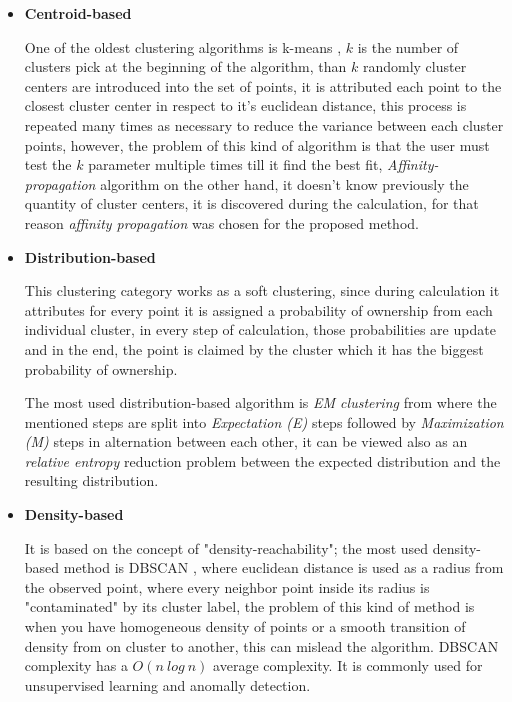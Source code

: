 \documentclass[ecp,tc,english]{iiufrgs}
\begin{document}
        \begin{itemize} 
            \item \textbf{Centroid-based}
            
            One of the oldest clustering algorithms is k-means \cite{steinhaus1956, macqueen1967}, \(k\) is the number of clusters pick at the beginning of the algorithm, than \(k\) randomly cluster centers are introduced into the set of points, it is attributed each point to the closest cluster center in respect to it's euclidean distance, this process is repeated many times as necessary to reduce the variance between each cluster points, however, the problem of this kind of algorithm is that the user must test the \(k\) parameter multiple times till it find the best fit, \textit{Affinity-propagation} algorithm  \cite{frey2007} on the other hand, it doesn't know previously the quantity of cluster centers, it is discovered during the calculation, for that reason \textit{affinity propagation} was chosen for the proposed method. 
            
            \item \textbf{Distribution-based} 
            
            This clustering category works as a soft clustering, since during calculation it attributes for every point it is assigned a probability of ownership from each individual cluster, in every step of calculation, those probabilities are update and in the end, the point is claimed by the cluster which it has the biggest probability of ownership.
            
            The most used distribution-based algorithm is \textit{EM clustering} from \cite{dempster1977} where the mentioned steps are split into \textit{Expectation (E)} steps followed by \textit{Maximization (M)} steps in alternation between each other, it can be viewed also as an \textit{relative entropy} reduction problem \cite{kullback1951} between the expected distribution and the resulting distribution.
            
            \item \textbf{Density-based}
            
            It is based on the concept of "density-reachability"; the most used density-based method is DBSCAN \cite{ester1996}, where euclidean distance is used as a radius from the observed point, where every neighbor point inside its radius is "contaminated" by its cluster label, the problem of this kind of method is when you have homogeneous density of points or a smooth transition of density from on cluster to another, this can mislead the algorithm. DBSCAN complexity has a \(O(n\ log\ n)\) average complexity. It is commonly used for unsupervised learning and anomally detection.
            

\end{itemize}
\end{document}
